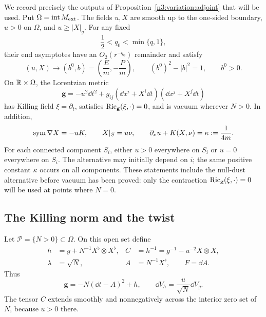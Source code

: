 We record precisely the outputs of Proposition~\ref{n3:variation:adjoint}
that will be used.
Put \(\Omega=\operatorname{int}M_{\mathrm{ext}}\).
The fields \(u,X\) are smooth up to the one-sided boundary,
\(u>0\) on \(\Omega\), and \(u\geq |X|_g\).
For any fixed
\[
\frac12<q_0<\min\{q,1\},
\]
their end asymptotes have an \(O_2(r^{-q_0})\) remainder and satisfy
\begin{equation}
\label{n3:static:asymptotic-field}
(u,X)\longrightarrow(b^0,b)
 =\left(\frac Em,-\frac Pm\right),
\qquad (b^0)^2-|b|^2=1,\qquad b^0>0.
\end{equation}
On \(\mathbb R\times\Omega\), the Lorentzian metric
\begin{equation}
\label{n3:static:stationary-metric}
\mathbf g=-u^2\dd t^2+
 g_{ij}(\dd x^i+X^i\dd t)(\dd x^j+X^j\dd t)
\end{equation}
has Killing field \(\xi=\partial_t\), satisfies
\(\operatorname{Ric}_{\mathbf g}(\xi,\cdot)=0\), and is vacuum wherever \(N>0\).
In addition,
\begin{equation}
\label{n3:static:kid-boundary}
\operatorname{sym}\nabla X=-uK,\qquad
X|_S=u\nu,\qquad
\partial_\nu u+K(X,\nu)=\kappa:=\frac1{4m}.
\end{equation}
For each connected component $S_i$, either $u>0$ everywhere on $S_i$
or $u=0$ everywhere on $S_i$. The alternative may initially depend on
$i$; the same positive constant $\kappa$ occurs on all components.
These statements include the null-dust alternative before vacuum has
been proved: only the contraction \(\operatorname{Ric}_{\mathbf g}(\xi,\cdot)=0\)
will be used at points where \(N=0\).

\subsection{The Killing norm and the twist}
\label{n3:static:twist-subsection}

Let \(\mathcal P=\{N>0\}\subset\Omega\). On this open set define
\begin{equation}
\label{n3:static:base-definitions}
\begin{aligned}
h&=g+N^{-1}X^\flat\otimes X^\flat,
& C&=h^{-1}=g^{-1}-u^{-2}X\otimes X,\\
\lambda&=\sqrt N,
& A&=N^{-1}X^\flat,\qquad F=\dd A .
\end{aligned}
\end{equation}
Thus
\begin{equation}
\label{n3:static:threading-form}
\mathbf g=-N(\dd t-A)^2+h,\qquad
\dd V_h=\frac u{\sqrt N}\dd V_g.
\end{equation}
The tensor \(C\) extends smoothly and nonnegatively across the interior
zero set of \(N\), because \(u>0\) there.

